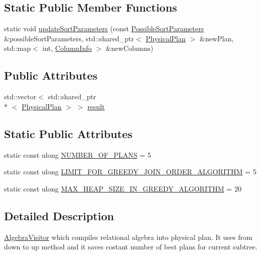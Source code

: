 \subsection*{Static Public Member Functions}
\begin{DoxyCompactItemize}
\item 
static void \hyperlink{class_algebra_compiler_a64b17061a41e21787cb35572b60d826d}{update\+Sort\+Parameters} (const \hyperlink{class_possible_sort_parameters}{Possible\+Sort\+Parameters} \&possible\+Sort\+Parameters, std\+::shared\+\_\+ptr$<$ \hyperlink{class_physical_plan}{Physical\+Plan} $>$ \&new\+Plan, std\+::map$<$ int, \hyperlink{class_column_info}{Column\+Info} $>$ \&new\+Columns)
\end{DoxyCompactItemize}
\subsection*{Public Attributes}
\begin{DoxyCompactItemize}
\item 
std\+::vector$<$ std\+::shared\+\_\+ptr\\*
$<$ \hyperlink{class_physical_plan}{Physical\+Plan} $>$ $>$ \hyperlink{class_algebra_compiler_acf3202bd193e4552a1d4fadb6d0b356c}{result}
\end{DoxyCompactItemize}
\subsection*{Static Public Attributes}
\begin{DoxyCompactItemize}
\item 
static const ulong \hyperlink{class_algebra_compiler_ab1a348c2daa3ca8f805f7cec2b35e29d}{N\+U\+M\+B\+E\+R\+\_\+\+O\+F\+\_\+\+P\+L\+A\+N\+S} = 5
\item 
static const ulong \hyperlink{class_algebra_compiler_a75bdf7e239082b0a6c8560ac5a75e72a}{L\+I\+M\+I\+T\+\_\+\+F\+O\+R\+\_\+\+G\+R\+E\+E\+D\+Y\+\_\+\+J\+O\+I\+N\+\_\+\+O\+R\+D\+E\+R\+\_\+\+A\+L\+G\+O\+R\+I\+T\+H\+M} = 5
\item 
static const ulong \hyperlink{class_algebra_compiler_aa67a35b24af1850ef0294e353f8a7184}{M\+A\+X\+\_\+\+H\+E\+A\+P\+\_\+\+S\+I\+Z\+E\+\_\+\+I\+N\+\_\+\+G\+R\+E\+E\+D\+Y\+\_\+\+A\+L\+G\+O\+R\+I\+T\+H\+M} = 20
\end{DoxyCompactItemize}


\subsection{Detailed Description}
\hyperlink{class_algebra_visitor}{Algebra\+Visitor} which compiles relational algebra into physical plan. It uses from down to up method and it saves costant number of best plans for current subtree. 

